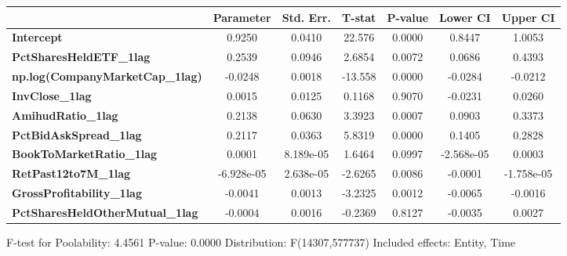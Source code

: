 \begin{center}
\begin{tabular}{lclc}
\bottomrule
\end{tabular}
\begin{tabular}{lcccccc}
                                        & \textbf{Parameter} & \textbf{Std. Err.} & \textbf{T-stat} & \textbf{P-value} & \textbf{Lower CI} & \textbf{Upper CI}  \\
\midrule
\textbf{Intercept}                      &       0.9250       &       0.0410       &      22.576     &      0.0000      &       0.8447      &       1.0053       \\
\textbf{PctSharesHeldETF\_1lag}         &       0.2539       &       0.0946       &      2.6854     &      0.0072      &       0.0686      &       0.4393       \\
\textbf{np.log(CompanyMarketCap\_1lag)} &      -0.0248       &       0.0018       &     -13.558     &      0.0000      &      -0.0284      &      -0.0212       \\
\textbf{InvClose\_1lag}                 &       0.0015       &       0.0125       &      0.1168     &      0.9070      &      -0.0231      &       0.0260       \\
\textbf{AmihudRatio\_1lag}              &       0.2138       &       0.0630       &      3.3923     &      0.0007      &       0.0903      &       0.3373       \\
\textbf{PctBidAskSpread\_1lag}          &       0.2117       &       0.0363       &      5.8319     &      0.0000      &       0.1405      &       0.2828       \\
\textbf{BookToMarketRatio\_1lag}        &       0.0001       &     8.189e-05      &      1.6464     &      0.0997      &     -2.568e-05    &       0.0003       \\
\textbf{RetPast12to7M\_1lag}            &     -6.928e-05     &     2.638e-05      &     -2.6265     &      0.0086      &      -0.0001      &     -1.758e-05     \\
\textbf{GrossProfitability\_1lag}       &      -0.0041       &       0.0013       &     -3.2325     &      0.0012      &      -0.0065      &      -0.0016       \\
\textbf{PctSharesHeldOtherMutual\_1lag} &      -0.0004       &       0.0016       &     -0.2369     &      0.8127      &      -0.0035      &       0.0027       \\
\bottomrule
\end{tabular}
\end{center}

F-test for Poolability: 4.4561 \newline
 P-value: 0.0000 \newline
 Distribution: F(14307,577737) \newline
  \newline
 Included effects: Entity, Time